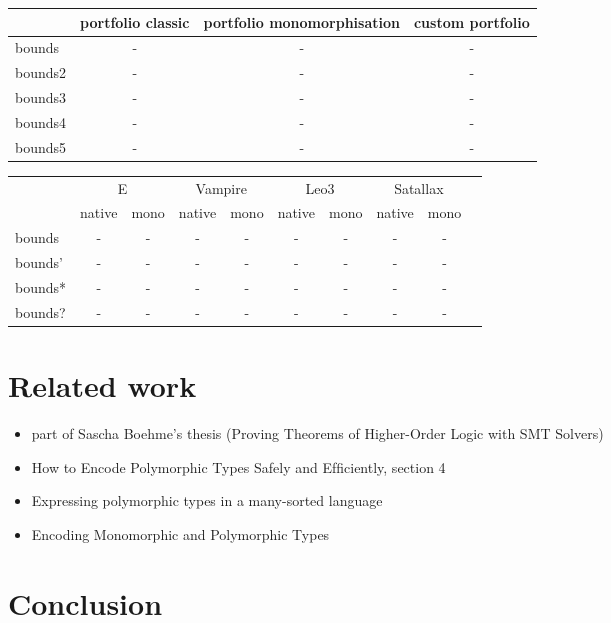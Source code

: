 \documentclass{article}
\begin{document}
\begin{center}
\begin{tabular}{lccc}
   \toprule
   &portfolio classic & portfolio monomorphisation & custom portfolio \\
   \midrule
   bounds  & -  & - & - \\
   bounds2 & - & - & - \\
   bounds3 & - & - & - \\
   bounds4 & - & - & - \\
   bounds5 & - & - & - \\

   \bottomrule
\end{tabular}
\end{center}

\bigskip
\bigskip
\bigskip

\begin{center}
\begin{tabular}{lccccccccc}
   \toprule
   & \multicolumn{2}{c}{E}   & \multicolumn{2}{c}{Vampire} &\multicolumn{2}{c}{Leo3} & \multicolumn{2}{c}{Satallax} \\
   \cmidrule(lr){2-3} \cmidrule(lr){4-5} \cmidrule(lr){6-7} \cmidrule(lr){8-9}
   & native & mono & native & mono & native & mono & native & mono\\
   \midrule
   bounds  & - & - & - & - & - & - & - & - \\
   bounds' & - & - & - & - & - & - & - & - \\
   bounds* & - & - & - & - & - & - & - & - \\
   bounds? & - & - & - & - & - & - & - & - \\
   \bottomrule
\end{tabular}
\end{center}

\break

\section{Related work}

\begin{itemize}
    \item part of Sascha Boehme's thesis (Proving Theorems of Higher-Order Logic with SMT Solvers)
    \item How to Encode Polymorphic Types Safely and Efﬁciently, section 4

    \item Expressing polymorphic types in a many-sorted language
    \item Encoding Monomorphic and Polymorphic Types
\end{itemize}

\section{Conclusion}


\end{document}
